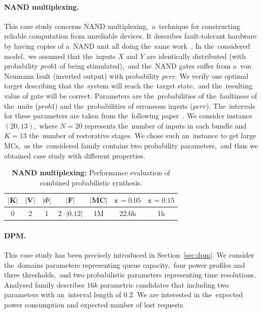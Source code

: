 \paragraph{NAND multiplexing.}
This case study concerns NAND multiplexing,~a~technique for constructing reliable computation from unreliable devices.
It describes fault-tolerant hardware by having copies of a~NAND unit all doing the~same work~\cite{nand}.
In the~considered model,~we assumed that the~inputs $X$ and $Y$ are identically distributed (with probability $prob1$ of being stimulated),~and the~NAND gates suffer from a~von Neumann fault (inverted output) with probability $perr$.
We verify one optimal target describing that the~system will reach the~target state,~and the~resulting value of gate will be correct.
Parameters are the~probabilities of the~faultiness of the~units ($prob1$) and the~probabilities of erroneous inputs ($perr$).
The~intervals for these parameters are taken from the~following paper~\cite{nand}.
We consider instance $(20, 13)$,~where $N=20$ represents the~number of inputs in each bundle and $K=13$ the~number of restorative stages.
We chose such an~instance to get large MCs,~as the~considered family contains two probability parameters,~and thus we obtained case study with different properties.

\begin{table}[h!]
\centering
\begin{tabular}{|c|c|c|c|c|c|c|}
\hline
$\lvert \mathbf{K} \rvert$ & $\lvert \mathbf{V} \rvert$ & $\lvert \varPhi \rvert$ & $\lvert \mathcal{\mathbf{F}} \rvert$ & $\overline{\mathbf{\lvert MC \rvert}}$ & $\mathbf{\varepsilon = 0.05}$ & $\mathbf{\varepsilon = 0.15}$ \\ \hline
0 & 2 & 1 & $2 \cdot \lvert 0.12 \rvert$ & 1M & 22.6h & 1h \\ \hline
\end{tabular}
\caption{\textbf{NAND multiplexing:} Performance evaluation of combined probabilistic synthesis.}
\end{table}

\vspace*{-0.4cm}
\paragraph{DPM.}
This case study has been precisely introduced in Section~\ref{sec:dpm}.
We consider the~domains parameters representing queue capacity,~four power profiles and three thresholds,~and two probabilistic parameters representing time resolutions.
Analysed family describes $16k$ parametric candidates that including two parameters with an~interval length of $0.2$.
We are interested in the~expected power consumption and expected number of lost requests.

